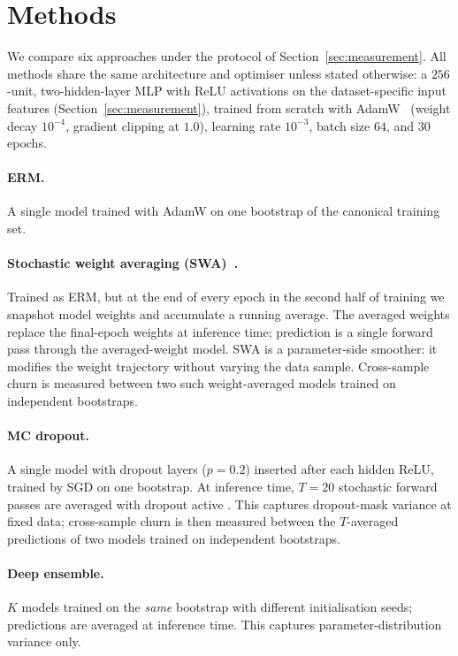 \section{Methods}
\label{sec:methods}

We compare six approaches under the protocol of
Section~\ref{sec:measurement}.  All methods share the same
architecture and optimiser unless stated otherwise: a $256$-unit,
two-hidden-layer MLP with ReLU activations on the dataset-specific
input features (Section~\ref{sec:measurement}), trained from
scratch with AdamW~\citep{loshchilov2019decoupled} (weight decay
$10^{-4}$, gradient clipping at $1.0$), learning rate $10^{-3}$,
batch size $64$, and $30$ epochs.

\paragraph{ERM.}
A single model trained with AdamW on one bootstrap of the canonical
training set.

\paragraph{Stochastic weight averaging (SWA)~\citep{izmailov2018averaging}.}
Trained as ERM, but at the end of every epoch in the second half of
training we snapshot model weights and accumulate a running average.
The averaged weights replace the final-epoch weights at inference time;
prediction is a single forward pass through the averaged-weight
model.  SWA is a parameter-side smoother: it modifies the weight
trajectory without varying the data sample.  Cross-sample churn is
measured between two such weight-averaged models trained on
independent bootstraps.

\paragraph{MC dropout.}
A single model with dropout layers ($p=0.2$) inserted after each
hidden ReLU, trained by SGD on one bootstrap.  At inference time, $T=20$
stochastic forward passes are averaged with dropout active
\citep{gal2015dropout}.  This captures dropout-mask variance at fixed
data; cross-sample churn is then measured between the
$T$-averaged predictions of two models trained on independent
bootstraps.

\paragraph{Deep ensemble.}
$K$ models trained on the \emph{same} bootstrap with different
initialisation seeds; predictions are averaged at inference time.  This
captures parameter-distribution variance only.

